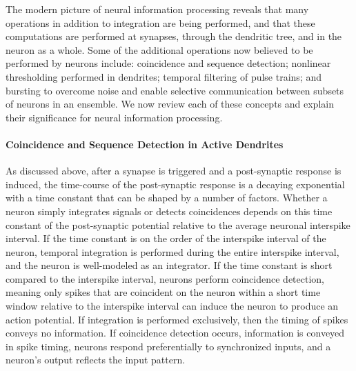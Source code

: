 \documentclass[twocolumn]{article}
\begin{document}
The modern picture of neural information processing reveals that many operations in addition to integration are being performed, and that these computations are performed at synapses, through the dendritic tree, and in the neuron as a whole. Some of the additional operations now believed to be performed by neurons include: coincidence and sequence detection; nonlinear thresholding performed in dendrites; temporal filtering of pulse trains; and bursting to overcome noise and enable selective communication between subsets of neurons in an ensemble. We now review each of these concepts and explain their significance for neural information processing.

\paragraph{Coincidence and Sequence Detection in Active Dendrites}
As discussed above, after a synapse is triggered and a post-synaptic response is induced, the time-course of the post-synaptic response is a decaying exponential with a time constant that can be shaped by a number of factors. Whether a neuron simply integrates signals or detects coincidences depends on this time constant of the post-synaptic potential relative to the average neuronal interspike interval. If the time constant is on the order of the interspike interval of the neuron, temporal integration is performed during the entire interspike interval, and the neuron is well-modeled as an integrator. If the time constant is short compared to the interspike interval, neurons perform coincidence detection, meaning only spikes that are coincident on the neuron within a short time window relative to the interspike interval can induce the neuron to produce an action potential. If integration is performed exclusively, then the timing of spikes conveys no information. If coincidence detection occurs, information is conveyed in spike timing, neurons respond preferentially to synchronized inputs, and a neuron's output reflects the input pattern.
\end{document}
